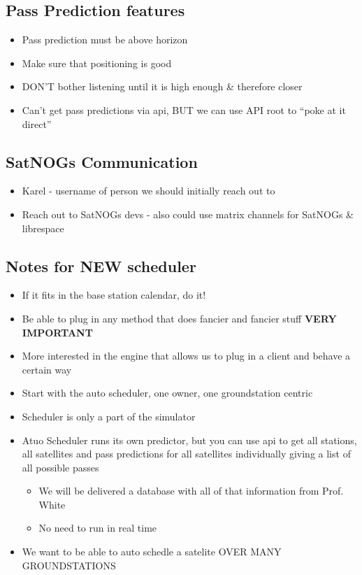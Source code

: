 \documentclass{article}
\begin{document}
\subsection{Pass Prediction features}

\begin{itemize}
\item Pass prediction must be above horizon
\item Make sure that positioning is good
\item DON'T bother listening until it is high enough \& therefore closer
\item Can't get pass predictions via api, BUT we can use API root to ``poke at it direct''
\end{itemize}

\subsection{SatNOGs Communication}

\begin{itemize}
\item Karel - username of person we should initially reach out to
\item Reach out to SatNOGs devs - also could use matrix channels for SatNOGs \& librespace
\end{itemize}


\subsection{Notes for NEW scheduler}

\begin{itemize}
\item If it fits in the base station calendar, do it!
\item Be able to plug in any method that does fancier and fancier stuff \textbf{VERY IMPORTANT}
\item More interested in the engine that allows us to plug in a client and behave a certain way
\item Start with the auto scheduler, one owner, one groundstation centric
\item Scheduler is only a part of the simulator
\item Atuo Scheduler runs its own predictor, but you can use api to get all stations, all satellites and pass predictions for all satellites individually giving a list of all possible passes
  \begin{itemize}
  \item We will be delivered a database with all of that information from Prof. White
    \item No need to run in real time
  \end{itemize}
\item We want to be able to auto schedle a satelite OVER MANY GROUNDSTATIONS
\end{itemize}
\end{document}
